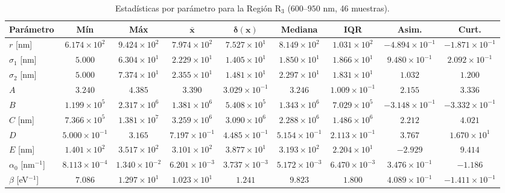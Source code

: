 \documentclass{article}
\begin{document}
\begin{table}[htbp]
\centering
\caption{Estad\'isticas por par\'ametro para la Regi\'on R$_3$ ($600$--$950$ nm, 46 muestras).}
\label{tab:bin2}
\begin{tabular}{@{}lcccccccc@{}} %
\toprule
\textbf{Par\'ametro} & \textbf{M\'in} & \textbf{M\'ax} & $\boldsymbol{\bar{x}}$ & $\boldsymbol{\delta(x)}$ & \textbf{Mediana} & \textbf{IQR} & \textbf{Asim.} & \textbf{Curt.} \\
\midrule
$r$ [nm] & $6.174 \times 10^2$ & $9.424 \times 10^2$ & $7.974 \times 10^2$ & $7.527 \times 10^1$ & $8.149 \times 10^2$ & $1.031 \times 10^2$ & $-4.894 \times 10^{-1}$ & $-1.871 \times 10^{-1}$ \\
$\sigma_{1}$ [nm] & $5.000$ & $6.304 \times 10^1$ & $2.229 \times 10^1$ & $1.405 \times 10^1$ & $1.850 \times 10^1$ & $1.866 \times 10^1$ & $9.480 \times 10^{-1}$ & $2.092 \times 10^{-1}$ \\
$\sigma_{2}$ [nm] & $5.000$ & $7.374 \times 10^1$ & $2.355 \times 10^1$ & $1.481 \times 10^1$ & $2.297 \times 10^1$ & $1.831 \times 10^1$ & $1.032$ & $1.200$ \\
$A$ & $3.240$ & $4.385$ & $3.390$ & $3.029 \times 10^{-1}$ & $3.246$ & $1.009 \times 10^{-1}$ & $2.155$ & $3.336$ \\
$B$ & $1.199 \times 10^5$ & $2.317 \times 10^6$ & $1.381 \times 10^6$ & $5.408 \times 10^5$ & $1.343 \times 10^6$ & $7.029 \times 10^5$ & $-3.148 \times 10^{-1}$ & $-3.332 \times 10^{-1}$ \\
$C$ [nm] & $7.366 \times 10^5$ & $1.381 \times 10^7$ & $3.259 \times 10^6$ & $3.090 \times 10^6$ & $2.288 \times 10^6$ & $1.486 \times 10^6$ & $2.212$ & $4.021$ \\
$D$ & $5.000 \times 10^{-1}$ & $3.165$ & $7.197 \times 10^{-1}$ & $4.485 \times 10^{-1}$ & $5.154 \times 10^{-1}$ & $2.113 \times 10^{-1}$ & $3.767$ & $1.670 \times 10^1$ \\
$E$ [nm] & $1.401 \times 10^2$ & $3.517 \times 10^2$ & $3.101 \times 10^2$ & $3.877 \times 10^1$ & $3.193 \times 10^2$ & $2.204 \times 10^1$ & $-2.929$ & $9.414$ \\
$\alpha_{0}$ [nm$^{-1}$] & $8.113 \times 10^{-4}$ & $1.340 \times 10^{-2}$ & $6.201 \times 10^{-3}$ & $3.737 \times 10^{-3}$ & $5.172 \times 10^{-3}$ & $6.470 \times 10^{-3}$ & $3.476 \times 10^{-1}$ & $-1.186$ \\
$\beta$ [eV$^{-1}$] & $7.086$ & $1.297 \times 10^1$ & $1.023 \times 10^1$ & $1.241$ & $9.823$ & $1.800$ & $4.089 \times 10^{-1}$ & $-1.411 \times 10^{-1}$ \\

\end{tabular}
\end{table}
\end{document}
